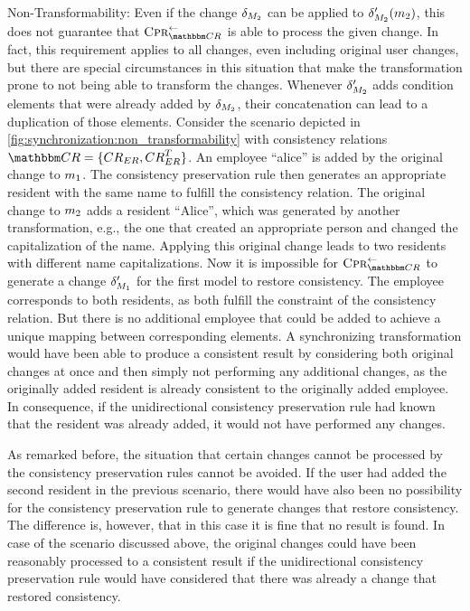 \begin{properdescription}
    \item[Non-Transformability:] Even if the change $\change{\metamodel{M}{2}}$ can be applied to $\change{\metamodel{M}{2}}'(\model{m}{2})$, this does not guarantee that $\consistencypreservationrule{\consistencyrelationset{CR}}^{\leftarrow}$ is able to process the given change.
    In fact, this requirement applies to all changes, even including original user changes, but there are special circumstances in this situation that make the transformation prone to not being able to transform the changes.
    Whenever $\change{\metamodel{M}{2}}'$ adds condition elements that were already added by $\change{\metamodel{M}{2}}$, their concatenation can lead to a duplication of those elements.
    Consider the scenario depicted in \autoref{fig:synchronization:non_transformability} with consistency relations $\consistencyrelationset{CR} = \setted{\consistencyrelation{CR}{ER}, \consistencyrelation{CR}{ER}^T}$. 
    An employee \enquote{alice} is added by the original change to $\model{m}{1}$.
    The consistency preservation rule then generates an appropriate resident with the same name to fulfill the consistency relation.
    The original change to $\model{m}{2}$ adds a resident \enquote{Alice}, which was generated by another transformation, e.g., the one that created an appropriate person and changed the capitalization of the name.
    Applying this original change leads to two residents with different name capitalizations.
    Now it is impossible for $\consistencypreservationrule{\consistencyrelationset{CR}}^{\leftarrow}$ to generate a change $\change{\metamodel{M}{1}}'$ for the first model to restore consistency. The employee corresponds to both residents, as both fulfill the constraint of the consistency relation. 
    But there is no additional employee that could be added to achieve a unique mapping between corresponding elements.
    A synchronizing transformation would have been able to produce a consistent result by considering both original changes at once and then simply not performing any additional changes, as the originally added resident is already consistent to the originally added employee.
    In consequence, if the unidirectional consistency preservation rule had known that the resident was already added, it would not have performed any changes.
\end{properdescription}

As remarked before, the situation that certain changes cannot be processed by the consistency preservation rules cannot be avoided. 
If the user had added the second resident in the previous scenario, there would have also been no possibility for the consistency preservation rule to generate changes that restore consistency.
The difference is, however, that in this case it is fine that no result is found.
In case of the scenario discussed above, the original changes could have been reasonably processed to a consistent result if the unidirectional consistency preservation rule would have considered that there was already a change that restored consistency.

